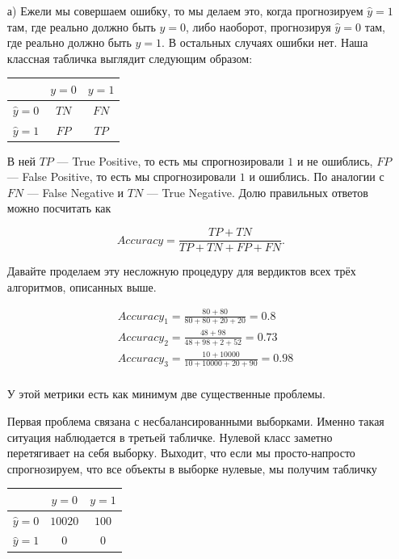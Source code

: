 \documentclass[12pt, a4paper, oneside]{article}
\theoremstyle{plain} %
\theoremstyle{definition}
\begin{document}
\begin{solution}
	\begin{enumerate}
		\item[а)] 	Ежели мы совершаем ошибку, то мы делаем это, когда прогнозируем $\hat y = 1$ там, где реально должно быть $y = 0$, либо наоборот, прогнозируя $\hat y = 0$ там, где реально должно быть $y=1$.  В остальных случаях ошибки нет.  Наша классная табличка выглядит следующим образом: 
		
	\begin{center}
		\begin{tabular}{|c|c|c|}
		\hline
		& $y=0$  &  $ y = 1$ \\  \hline 
		$\hat y = 0$  &   $TN$ &    $FN$ \\      \hline 
		$\hat y = 1$ &   $FP$ &     $TP$ \\      \hline 
		\end{tabular}
	\end{center}
		
		В ней $TP$ --- True Positive, то есть мы спрогнозировали $1$ и не ошиблись, $FP$ --- False Positive, то есть мы спрогнозировали $1$ и ошиблись. По аналогии с $FN$ --- False Negative и  $TN$ --- True Negative. Долю правильных ответов можно посчитать как 
		
		\[
		Accuracy = \frac{TP + TN}{TP + TN + FP + FN}.
		\]
		
		Давайте проделаем эту несложную процедуру для вердиктов всех трёх алгоритмов, описанных выше. 
		
		\begin{equation} 
		\begin{aligned}
		&Accuracy_1 = \frac{80 + 80}{80 + 80 + 20 + 20} = 0.8   \\ 
		&Accuracy_2 = \frac{48 + 98}{48 + 98 + 2 + 52} = 0.73  \\ 
		&Accuracy_3 = \frac{10 + 10000}{10 + 10000 + 20 + 90} = 0.98  \\ 
		\end{aligned}
		\end{equation} 
		
		У этой метрики есть как минимум две существенные проблемы. 
		
		Первая проблема связана с несбалансированными выборками. Именно такая ситуация наблюдается в третьей табличке. Нулевой класс заметно перетягивает на себя выборку. Выходит, что если мы просто-напросто спрогнозируем, что все объекты в выборке нулевые, мы получим табличку 
		
		\begin{center}
			\begin{tabular}{|c|c|c|}
					\hline
		& $y=0$  &  $ y = 1$ \\  \hline 
		$\hat y = 0$  &   $10020$ &    $100$ \\      \hline 
		$\hat y = 1$ &   $0$ &     $0$ \\      \hline 
			\end{tabular}
		\end{center}
		

\end{enumerate}
\end{solution}
\end{document}
